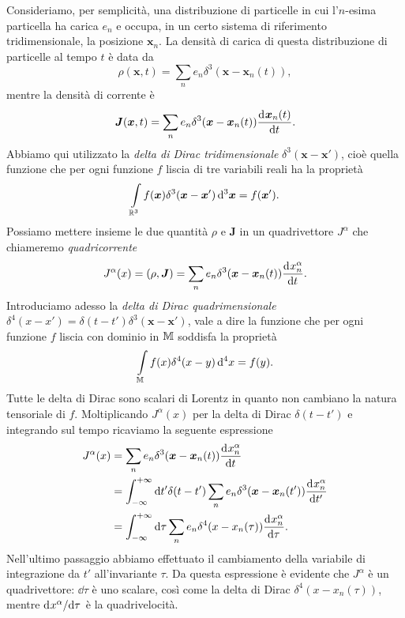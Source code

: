 Consideriamo, per semplicità, una distribuzione di particelle in cui l'$n$-esima
particella ha carica $e_{n}$ e occupa, in un certo sistema di riferimento
tridimensionale, la posizione $\bm{x}_{n}$.  La densità di carica di questa
distribuzione di particelle al tempo $t$ è data da
\begin{equation}
  \rho(\bm{x},t) = \sum_{n} e_{n}\delta^{3}(\bm{x} - \bm{x}_{n}(t)),
\end{equation}
mentre la densità di corrente è
\begin{equation}
  \bm{J}(\bm{x},t) = \sum_{n} e_{n}\delta^{3}(\bm{x} - \bm{x}_{n}(t))
  \frac{{\mathop{}\!\mathrm{d}^{}}\bm{x}_{n}(t)}{\mathop{}\!\mathrm{d} {t}^{}}.
\end{equation}
Abbiamo qui utilizzato la 
\emph{delta di Dirac tridimensionale} $\delta^{3}(\bm{x} - \bm{x}')$, cioè
quella funzione che per ogni funzione $f$ liscia di tre variabili reali ha la
proprietà
\begin{equation}
  \int\limits_{\mathbb{R}^{3}} f(\bm{x})\delta^{3}(\bm{x} - \bm{x}') \mathop{}\!\mathrm{d}^{3} \bm{x} =
  f(\bm{x}').
\end{equation}
Possiamo mettere insieme le due quantità $\rho$ e $\bm{J}$ in un quadrivettore
$J^{\alpha}$ che chiameremo \emph{quadricorrente}
\begin{equation}
  J^{\alpha}(x) = (\rho, \bm{J}) = \sum_{n} e_{n}\delta^{3}(\bm{x} -
  \bm{x}_{n}(t)) \frac{{\mathop{}\!\mathrm{d}^{}}x_{n}^{\alpha}}{\mathop{}\!\mathrm{d} {t}^{}}.
\end{equation}
Introduciamo adesso la 
\emph{delta di Dirac quadrimensionale}
$\delta^{4}(x - x') = \delta(t - t')\delta^{3}(\bm{x} - \bm{x}')$, vale a dire
la funzione che per ogni funzione $f$ liscia con dominio in $\mathbb{M}$ soddisfa la
proprietà
\begin{equation}
  \int\limits_{\mathbb{M}} f(x)\delta^{4}(x - y)\mathop{}\!\mathrm{d}^{4} x = f(y).
\end{equation}
Tutte le delta di Dirac sono scalari di Lorentz in quanto non cambiano la natura
tensoriale di $f$.  Moltiplicando $J^{\alpha}(x)$ per la delta di Dirac
$\delta(t - t')$ e integrando sul tempo ricaviamo la seguente espressione
\begin{equation}
  \label{eq:quadricorrente}
  \begin{split}
    J^{\alpha}(x) &= \sum_{n} e_{n}\delta^{3}(\bm{x} - \bm{x}_{n}(t))
    \toder{x_{n}^{\alpha}}{t} \\
    &= \int_{-\infty}^{+\infty}\dd t' \delta(t - t') \sum_{n}
    e_{n}\delta^{3}(\bm{x} - \bm{x}_{n}(t')) \toder{x_{n}^{\alpha}}{t'} \\
    &= \int_{-\infty}^{+\infty} \dd \tau \sum_{n} e_{n} \delta^{4}(x -
    x_{n}(\tau)) \toder{x_{n}^{\alpha}}{\tau}.
  \end{split}
\end{equation}
Nell'ultimo passaggio abbiamo effettuato il cambiamento della variabile di
integrazione da $t'$ all'invariante $\tau$.  Da questa espressione è evidente
che $J^{\alpha}$ è un quadrivettore: $\dd \tau$ è uno scalare, così come la
delta di Dirac $\delta^{4}(x - x_{n}(\tau))$, mentre $\mathrm{d}^{}x^{\alpha} / \mathrm{d} {\tau}^{}$
è la quadrivelocità.

